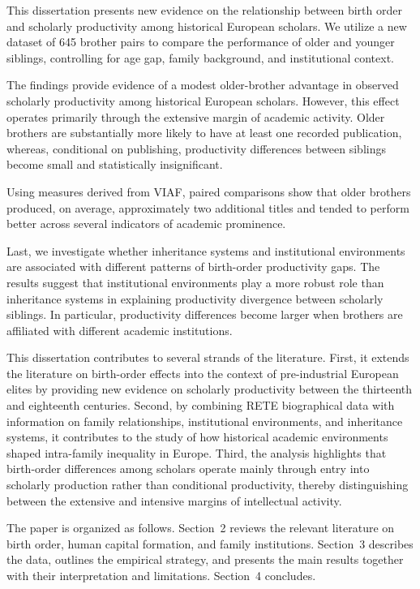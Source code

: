 This dissertation presents new evidence on the relationship between birth order and scholarly productivity among historical European scholars. We utilize a new dataset of 645 brother pairs to compare the performance of older and younger siblings, controlling for age gap, family background, and institutional context.

The findings provide evidence of a modest older-brother advantage in observed scholarly productivity among historical European scholars. However, this effect operates primarily through the extensive margin of academic activity. Older brothers are substantially more likely to have at least one recorded publication, whereas, conditional on publishing, productivity differences between siblings become small and statistically insignificant.

Using measures derived from VIAF, paired comparisons show that older brothers produced, on average, approximately two additional titles and tended to perform better across several indicators of academic prominence.

Last, we investigate whether inheritance systems and institutional environments are associated with different patterns of birth-order productivity gaps. The results suggest that institutional environments play a more robust role than inheritance systems in explaining productivity divergence between scholarly siblings. In particular, productivity differences become larger when brothers are affiliated with different academic institutions.

This dissertation contributes to several strands of the literature. First, it extends the literature on birth-order effects into the context of pre-industrial European elites by providing new evidence on scholarly productivity between the thirteenth and eighteenth centuries. Second, by combining RETE biographical data with information on family relationships, institutional environments, and inheritance systems, it contributes to the study of how historical academic environments shaped intra-family inequality in Europe. Third, the analysis highlights that birth-order differences among scholars operate mainly through entry into scholarly production rather than conditional productivity, thereby distinguishing between the extensive and intensive margins of intellectual activity.

The paper is organized as follows. Section~2 reviews the relevant literature on birth order, human capital formation, and family institutions. Section~3 describes the data, outlines the empirical strategy, and presents the main results together with their interpretation and limitations. Section~4 concludes.